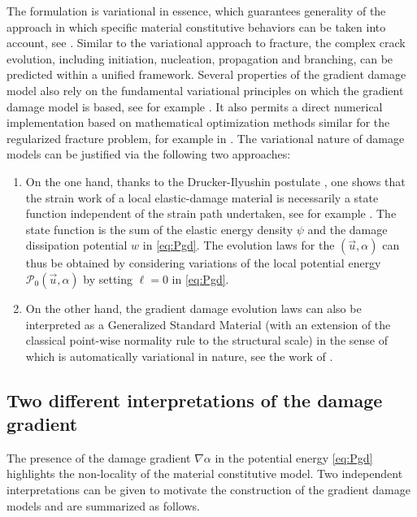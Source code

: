 The formulation is variational in essence, which guarantees generality of the approach in which specific material constitutive behaviors can be taken into account, see \cite{PhamMarigoMaurini:2011,PhamMarigo:2013}. Similar to the variational approach to fracture, the complex crack evolution, including initiation, nucleation, propagation and branching, can be predicted within a unified framework. Several properties of the gradient damage model also rely on the fundamental variational principles on which the gradient damage model is based, see for example \cite{SicsicMarigo:2013,SicsicMarigoMaurini:2013}. It also permits a direct numerical implementation based on mathematical optimization methods similar for the regularized fracture problem, for example in \cite{AmorMarigoMaurini:2009,PhamAmorMarigoMaurini:2011}. The variational nature of damage models can be justified via the following two approaches:
\begin{enumerate}
\item On the one hand, thanks to the Drucker-Ilyushin postulate \cite{Marigo:2002}, one shows that the strain work of a local elastic-damage material is necessarily a state function independent of the strain path undertaken, see for example \cite{PhamMarigo:2010}. The state function is the sum of the elastic energy density $\psi$ and the damage dissipation potential $w$ in \eqref{eq:Pgd}. The evolution laws for the $(\vec{u},\alpha)$ can thus be obtained by considering variations of the local potential energy $\mathcal{P}_0(\vec{u},\alpha)$ by setting $\ell=0$ in \eqref{eq:Pgd}.

\item On the other hand, the gradient damage evolution laws can also be interpreted as a Generalized Standard Material (with an extension of the classical point-wise normality rule to the structural scale) in the sense of \cite{Halphen:1975aa} which is automatically variational in nature, see the work of \cite{LorentzAndrieux:1999,LorentzBenallal:2005}.
\end{enumerate}

\subsection{Two different interpretations of the damage gradient}
The presence of the damage gradient $\nabla\alpha$ in the potential energy \eqref{eq:Pgd} highlights the non-locality of the material constitutive model. Two independent interpretations can be given to motivate the construction of the gradient damage models and are summarized as follows.

